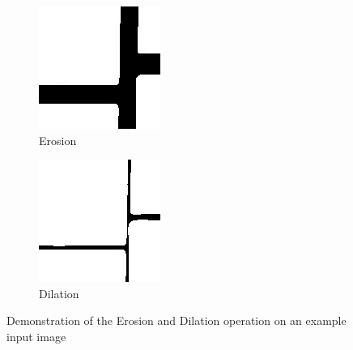 \documentclass[serif,article,noparskip]{agse-thesis}
\begin{document}
\begin{figure}
\begin{subfigure}{.3\textwidth}
  \includegraphics[width=\linewidth]{images/example-erode.jpg}
  \caption{Erosion}
  \label{fig:erosion}
\end{subfigure}
\begin{subfigure}{.3\textwidth}
  \centering
  \includegraphics[width=\linewidth]{images/example-dilate.jpg}
  \caption{Dilation}
  \label{fig:dilation}
\end{subfigure}
\caption{Demonstration of the Erosion and Dilation operation on an example input image}
\label{fig:morphology}
\end{figure}
\end{document}
